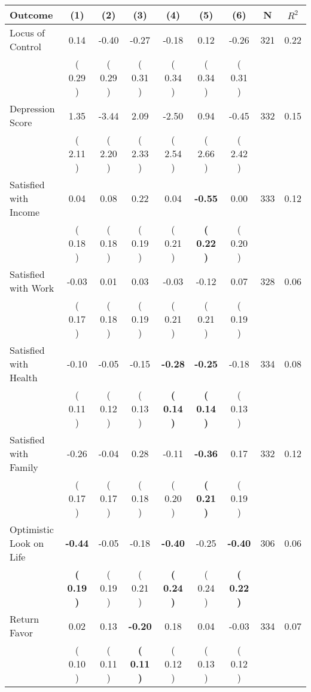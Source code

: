 \begin{tabular}{lcccccccc}
\toprule
 \textbf{Outcome} & \textbf{(1)} & \textbf{(2)} & \textbf{(3)} & \textbf{(4)} & \textbf{(5)} & \textbf{(6)} & \textbf{N} & \textbf{$ R^2$} \\
\midrule
Locus of Control &      0.14 &     -0.40 &     -0.27 &     -0.18 &      0.12 &     -0.26 & 321 &       0.22 \\ 
 & (     0.29 ) & (     0.29 ) & (     0.31 ) & (     0.34 ) & (     0.34 ) & (     0.31 ) & \\
Depression Score &      1.35 &     -3.44 &      2.09 &     -2.50 &      0.94 &     -0.45 & 332 &       0.15 \\ 
 & (     2.11 ) & (     2.20 ) & (     2.33 ) & (     2.54 ) & (     2.66 ) & (     2.42 ) & \\
Satisfied with Income &      0.04 &      0.08 &      0.22 &      0.04 & \textbf{    -0.55} &      0.00 & 333 &       0.12 \\ 
 & (     0.18 ) & (     0.18 ) & (     0.19 ) & (     0.21 ) & \textbf{(     0.22 )} & (     0.20 ) & \\
Satisfied with Work &     -0.03 &      0.01 &      0.03 &     -0.03 &     -0.12 &      0.07 & 328 &       0.06 \\ 
 & (     0.17 ) & (     0.18 ) & (     0.19 ) & (     0.21 ) & (     0.21 ) & (     0.19 ) & \\
Satisfied with Health &     -0.10 &     -0.05 &     -0.15 & \textbf{    -0.28} & \textbf{    -0.25} &     -0.18 & 334 &       0.08 \\ 
 & (     0.11 ) & (     0.12 ) & (     0.13 ) & \textbf{(     0.14 )} & \textbf{(     0.14 )} & (     0.13 ) & \\
Satisfied with Family &     -0.26 &     -0.04 &      0.28 &     -0.11 & \textbf{    -0.36} &      0.17 & 332 &       0.12 \\ 
 & (     0.17 ) & (     0.17 ) & (     0.18 ) & (     0.20 ) & \textbf{(     0.21 )} & (     0.19 ) & \\
Optimistic Look on Life & \textbf{    -0.44} &     -0.05 &     -0.18 & \textbf{    -0.40} &     -0.25 & \textbf{    -0.40} & 306 &       0.06 \\ 
 & \textbf{(     0.19 )} & (     0.19 ) & (     0.21 ) & \textbf{(     0.24 )} & (     0.24 ) & \textbf{(     0.22 )} & \\
Return Favor &      0.02 &      0.13 & \textbf{    -0.20} &      0.18 &      0.04 &     -0.03 & 334 &       0.07 \\ 
 & (     0.10 ) & (     0.11 ) & \textbf{(     0.11 )} & (     0.12 ) & (     0.13 ) & (     0.12 ) & \\

\end{tabular}
